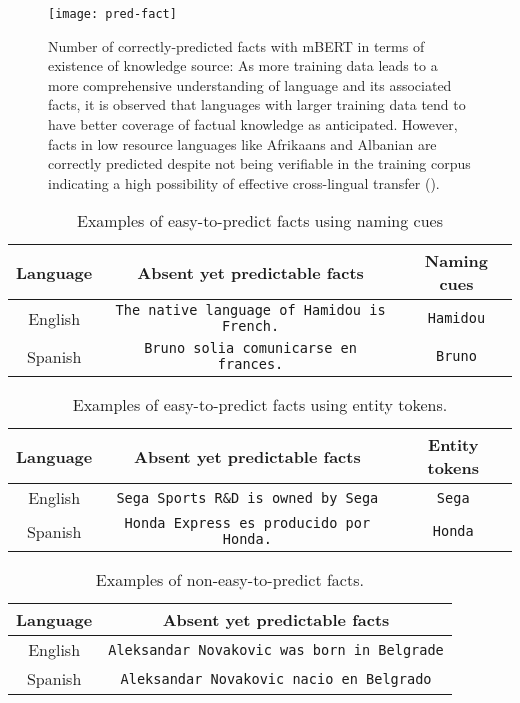 \begin{figure}[tbh]
	\centering
	\texttt{[image: pred-fact]}
	\caption[Number of correctly-predicted facts with mBERT in terms of existence of knowledge source]{Number of correctly-predicted facts with mBERT in terms of existence of knowledge source: As more training data leads to a more comprehensive understanding of language and its associated facts, it is observed that languages with larger training data tend to have better coverage of factual knowledge as anticipated. However, facts in low resource languages like Afrikaans and Albanian are correctly predicted despite not being verifiable in the training corpus indicating a high possibility of effective cross-lingual transfer (\citet{zhao2024tracing}).}
	\label{fig: pred-fact}
\end{figure}

\begin{table}[tbh!]
	\centering
	\begin{tabular}{c c c}
		\hline
		\textbf{Language} & \textbf{Absent yet predictable facts} & \textbf{Naming cues} \\
		\hline
		English & \texttt{The native language of Hamidou is French.} & \texttt{Hamidou} \\
		Spanish & \texttt{Bruno solia comunicarse en frances.} & \texttt{Bruno} \\
		\hline
	\end{tabular}
	\caption{Examples of easy-to-predict facts using naming cues}
	\label{T:naming-cues}
\end{table}

\begin{table}[tbh!]
	\centering
	\begin{tabular}{c c c}
		\hline
		\textbf{Language} & \textbf{Absent yet predictable facts} & \textbf{Entity tokens} \\
		\hline
		English & \texttt{Sega Sports R\&D is owned by Sega} & \texttt{Sega} \\
		Spanish & \texttt{Honda Express es producido por Honda.} & \texttt{Honda} \\
		\hline
	\end{tabular}
	\caption{Examples of easy-to-predict facts using entity tokens.}
	\label{T:shared-entity}
\end{table}

\begin{table}[tbh!]
	\centering
	\begin{tabular}{c c}
		\hline
		\textbf{Language} & \textbf{Absent yet predictable facts}  \\
		\hline
		English & \texttt{Aleksandar Novakovic was born in Belgrade} \\
		Spanish & \texttt{Aleksandar Novakovic nacio en Belgrado} \\
		\hline
	\end{tabular}
	\caption{Examples of non-easy-to-predict facts.}
	\label{T:other}
\end{table}
	
